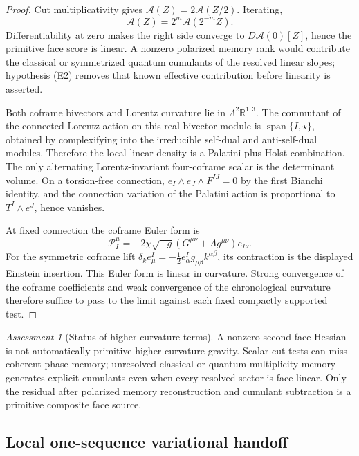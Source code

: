 \documentclass[11pt]{article}
\theoremstyle{definition}
\theoremstyle{remark}
\newtheorem{assessment}[theorem]{Assessment}
\newcommand{\R}{\mathbb R}
\newcommand{\Span}{\operatorname{span}}
\begin{document}
\begin{proof}
Cut multiplicativity gives
\(\mathcal A(Z)=2\mathcal A(Z/2)\).  Iterating,
\[
 \mathcal A(Z)=2^m\mathcal A(2^{-m}Z).
\]
Differentiability at zero makes the right side converge to
\(D\mathcal A(0)[Z]\), hence the primitive face score is linear.  A nonzero
polarized memory rank would contribute the classical or symmetrized quantum
cumulants of the resolved linear slopes; hypothesis \textup{(E2)} removes that
known effective contribution before linearity is asserted.

Both coframe bivectors and Lorentz curvature lie in \(\Lambda^2\R^{1,3}\).
The commutant of the connected Lorentz action on this real bivector module is
\(\Span\{I,\star\}\), obtained by complexifying into the irreducible
self-dual and anti-self-dual modules.  Therefore the local linear density is a
Palatini plus Holst combination.  The only alternating Lorentz-invariant
four-coframe scalar is the determinant volume.  On a torsion-free connection,
\(e_I\wedge e_J\wedge F^{IJ}=0\) by the first Bianchi identity, and the
connection variation of the Palatini action is proportional to
\(T^I\wedge e^J\), hence vanishes.

At fixed connection the coframe Euler form is
\[
 \mathcal P_I^{\mu}
 =-2\chi\sqrt{-g}
   (G^{\mu\nu}+\Lambda g^{\mu\nu})e_{I\nu}.
\]
For the symmetric coframe lift
\(\delta_ke_\mu^I=-\tfrac12e_\alpha^Ig_{\mu\beta}k^{\alpha\beta}\), its
contraction is the displayed Einstein insertion.  This Euler form is linear in
curvature.  Strong convergence of the coframe coefficients and weak
convergence of the chronological curvature therefore suffice to pass to the
limit against each fixed compactly supported test.
\end{proof}

\begin{assessment}[Status of higher-curvature terms]
A nonzero second face Hessian is not automatically primitive higher-curvature
gravity.  Scalar cut tests can miss coherent phase memory; unresolved
classical or quantum multiplicity memory generates explicit cumulants even
when every resolved sector is face linear.  Only the residual after polarized
memory reconstruction and cumulant subtraction is a primitive composite face
source.
\end{assessment}

\subsection{Local one-sequence variational handoff}
\end{document}
